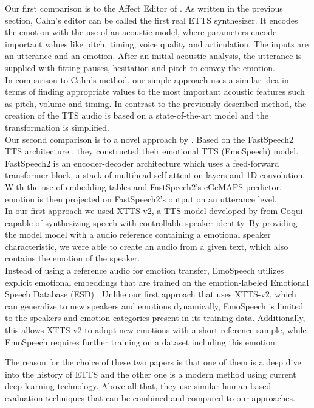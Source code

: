 \documentclass[11pt]{article}
\begin{document}
Our first comparison is to the Affect Editor of \cite{cahn_generation_2000}. As written in the previous section, Cahn's editor can be called the first real ETTS synthesizer. It encodes the emotion with the use of an acoustic model, where parameters encode important values like pitch, timing, voice quality and articulation. The inputs are an utterance and an emotion. After an initial acoustic analysis, the utterance is supplied with fitting pauses, hesitation and pitch to convey the emotion. \\
In comparison to Cahn's method, our simple approach uses a similar idea in terms of finding appropriate values to the most important acoustic features such as pitch, volume and timing. In contrast to the previously described method, the creation of the TTS audio is based on a state-of-the-art model and the transformation is simplified.\\
Our second comparison is to a novel approach by \cite{diatlova_emospeech_2023}. Based on the FastSpeech2 TTS architecture \cite{ren2020fastspeech}, they constructed their emotional TTS (EmoSpeech) model. FastSpeech2 is an encoder-decoder architecture which uses a feed-forward transformer block, a stack of multihead self-attention layers and 1D-convolution. With the use of embedding tables and FastSpeech2's eGeMAPS predictor, emotion is then projected on FastSpeech2's output on an utterance level. \\
In our first approach we used XTTS-v2, a TTS model developed by \cite{casanova2024xtts} from Coqui capable of synthesizing speech with controllable speaker identity. By providing the model model with a audio reference containing a emotional speaker characteristic, we were able to create an audio from a given text, which also contains the emotion of the speaker. \\
Instead of using a reference audio for emotion transfer, EmoSpeech utilizes explicit emotional embeddings that are trained on the emotion-labeled Emotional Speech Database (ESD) \cite{zhou2022emotional}. Unlike our first approach that uses XTTS-v2, which can generalize to new speakers and emotions dynamically, EmoSpeech is limited to the speakers and emotion categories present in its training data. Additionally, this allows XTTS-v2 to adopt new emotions with a short reference sample, while EmoSpeech requires further training on a dataset including this emotion.   

The reason for the choice of these two papers is that one of them is a deep dive into the history of ETTS and the other one is a modern method using current deep learning technology. Above all that, they use similar human-based evaluation techniques that can be combined and compared to our approaches.
\end{document}

